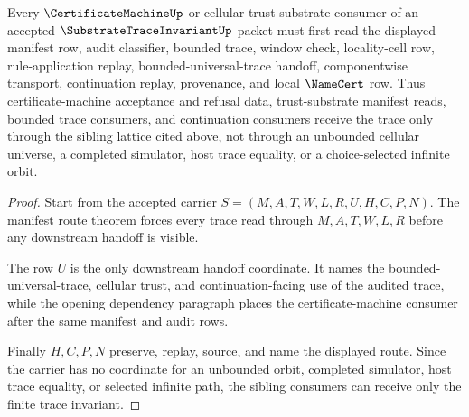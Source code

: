 \begin{theorem}
\label{thm:substrate-trace-invariant-sibling-lattice-route}
Every $\CertificateMachineUp$ or cellular trust substrate consumer of an accepted $\SubstrateTraceInvariantUp$ packet must first read the displayed manifest row, audit classifier, bounded trace, window check, locality-cell row, rule-application replay, bounded-universal-trace handoff, componentwise transport, continuation replay, provenance, and local $\NameCert$ row. Thus certificate-machine acceptance and refusal data, trust-substrate manifest reads, bounded trace consumers, and continuation consumers receive the trace only through the sibling lattice cited above, not through an unbounded cellular universe, a completed simulator, host trace equality, or a choice-selected infinite orbit.
\end{theorem}
\begin{proof}
Start from the accepted carrier $S=(M,A,T,W,L,R,U,H,C,P,N)$. The manifest route theorem forces every trace read through $M,A,T,W,L,R$ before any downstream handoff is visible.

The row $U$ is the only downstream handoff coordinate. It names the bounded-universal-trace, cellular trust, and continuation-facing use of the audited trace, while the opening dependency paragraph places the certificate-machine consumer after the same manifest and audit rows.

Finally $H,C,P,N$ preserve, replay, source, and name the displayed route. Since the carrier has no coordinate for an unbounded orbit, completed simulator, host trace equality, or selected infinite path, the sibling consumers can receive only the finite trace invariant.
\end{proof}



